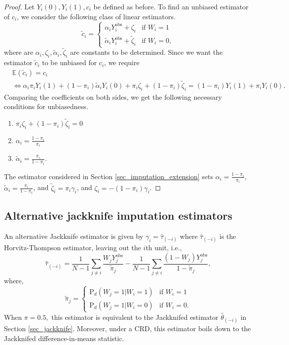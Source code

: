 \documentclass[12pt]{article}
\newcommand{\E}{{\mathbb{E}}}
\renewcommand{\Pr}{{\text{P}}}
\begin{document}
\begin{proof}
    Let $Y_i(0),Y_i(1), c_i$ be defined as before. To find an unbiased estimator of $c_i$, we consider the following class of linear estimators.
\begin{equation}
  \tilde{c}_i = 
    \begin{cases}
     \alpha_i Y^{\text{obs}}_i + \zeta_i & \text{if $W_i = 1$}\\
    \tilde{\alpha}_i Y^{\text{obs}}_i + \tilde{\zeta}_i & \text{if $W_i = 0$},
    \end{cases}       
\end{equation}
where are $\alpha_i,\zeta_i,\tilde{\alpha}_i,\tilde{\zeta}_i$ are constants to be determined. Since we want the estimator $\tilde{c}_i$ to be unbiased for $c_i$, we require
\begin{align}
    &\E(\tilde{c}_i) = c_i \nonumber \\
   &\iff \alpha_i\pi_iY_i(1) + (1-\pi_i)\tilde{\alpha}_iY_i(0) + \pi_i\zeta_i + (1-\pi_i)\tilde{\zeta}_i = (1-\pi_i)Y_i(1) + \pi_iY_i(0).
\end{align}
Comparing the coefficients on both sides, we get the following necessary conditions for unbiasedness.
\begin{enumerate}
    \item $\pi_i\zeta_i + (1-\pi_i)\tilde{\zeta}_i = 0$
    \item $\alpha_i = \frac{1-\pi_i}{\pi_i}$
    \item $\tilde{\alpha}_i = \frac{\pi_i}{1 - \pi_i}$.
\end{enumerate}
The estimator considered in Section \ref{sec_imputation_extension} sets $\alpha_i = \frac{1-\pi_i}{\pi_i}$, $\tilde{\alpha}_i = \frac{\pi_i}{1 - \pi_i}$, and $\tilde{\zeta}_i  = \pi_i\gamma_i$, and $\zeta_i = -(1-\pi_i)\gamma_i$.
\end{proof}

\subsection{Alternative jackknife imputation estimators}
\label{appsec_alternative}

An alternative Jackknife estimator is given by $\gamma_i = \hat{\tau}_{(-i)}$ where $\hat{\tau}_{(-i)}$ is the Horvitz-Thompson estimator, leaving out the $i$th unit, i.e., 
    \begin{equation}
  \hat{\tau}_{(-i)} = \frac{1}{N-1}\sum_{j \neq i}\frac{W_jY^{\text{obs}}_j}{\tilde{\pi}_{j}} - \frac{1}{N-1}\sum_{j \neq i}\frac{(1-W_j)Y^{\text{obs}}_j}{1-\tilde{\pi}_{j}},
    \label{eq_jack2}
\end{equation}
where,
\begin{equation}
     \tilde{\pi}_j =
    \begin{cases}
      \Pr_d(W_j = 1|W_i = 1) & \text{if $W_i = 1$}\\
    \Pr_d(W_j=1|W_i = 0) & \text{if $W_i = 0$}.
    \end{cases}  
\end{equation}
When $\pi = 0.5,$ this estimator is equivalent to the Jackknifed estimator $\hat{\theta}_{(-i)}$ in Section \ref{sec_jackknife}. Moreover, under a CRD, this estimator boils down to the Jackknifed difference-in-means statistic.
\end{document}
